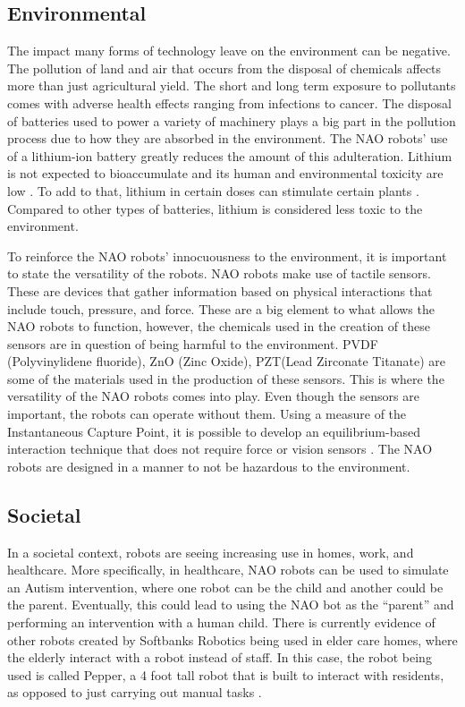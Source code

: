 \subsection{Environmental}
The impact many forms of technology leave on the environment can be negative. The pollution of land and air that occurs from the disposal of chemicals affects more than just agricultural yield. The short and long term exposure to pollutants comes with adverse health effects ranging from infections to cancer. The disposal of batteries used to power a variety of machinery plays a big part in the pollution process due to how they are absorbed in the environment. The NAO robots’ use of a lithium-ion battery greatly reduces the amount of this adulteration. Lithium is not expected to bioaccumulate and its human and environmental toxicity are low \cite{ARAL2008349}. To add to that, lithium in certain doses can stimulate certain plants \cite{ARAL2008349}. Compared to other types of batteries, lithium is considered less toxic to the environment.\par

To reinforce the NAO robots’ innocuousness to the environment, it is important to state the versatility of the robots. NAO robots make use of tactile sensors. These are devices that gather information based on physical interactions that include touch, pressure, and force. These are a big element to what allows the NAO robots to function, however, the chemicals used in the creation of these sensors are in question of being harmful to the environment. PVDF (Polyvinylidene fluoride), ZnO (Zinc Oxide), PZT(Lead Zirconate Titanate) are some of the materials used in the production of these sensors. This is where the versatility of the NAO robots comes into play. Even though the sensors are important, the robots can operate without them. Using a measure of the Instantaneous Capture Point, it is possible to develop an equilibrium-based interaction technique that does not require force or vision sensors \cite{6907003}. The NAO robots are designed in a manner to not be hazardous to the environment.\par

\subsection{Societal}

In a societal context, robots are seeing increasing use in homes, work, and healthcare.  More specifically, in healthcare, NAO robots can be used to simulate an Autism intervention, where one robot can be the child and another could be the parent.  Eventually, this could lead to using the NAO bot as the “parent” and performing an intervention with a human child.  There is currently evidence of other robots created by Softbanks Robotics being used in elder care homes, where the elderly interact with a robot instead of staff.  In this case, the robot being used is called Pepper, a 4 foot tall robot that is built to interact with residents, as opposed to just carrying out manual tasks \cite{lucy}.\par

